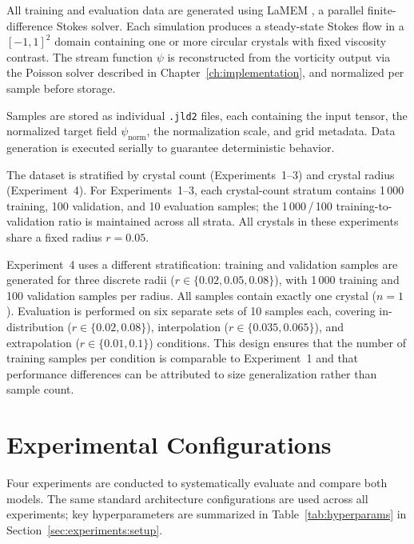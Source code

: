 All training and evaluation data are generated using LaMEM \parencite{Popov2013LaMEM}, a parallel finite-difference Stokes solver. Each simulation produces a steady-state Stokes flow in a $[-1,1]^2$ domain containing one or more circular crystals with fixed viscosity contrast. The stream function $\psi$ is reconstructed from the vorticity output via the Poisson solver described in Chapter~\ref{ch:implementation}, and normalized per sample before storage.

Samples are stored as individual \texttt{.jld2} files, each containing the input tensor, the normalized target field $\psi_{\mathrm{norm}}$, the normalization scale, and grid metadata. Data generation is executed serially to guarantee deterministic behavior.

The dataset is stratified by crystal count (Experiments~1--3) and crystal radius (Experiment~4). For Experiments~1--3, each crystal-count stratum contains 1\,000 training, 100 validation, and 10 evaluation samples; the 1\,000\,/\,100 training-to-validation ratio is maintained across all strata. All crystals in these experiments share a fixed radius $r = 0.05$.

Experiment~4 uses a different stratification: training and validation samples are generated for three discrete radii ($r \in \{0.02, 0.05, 0.08\}$), with 1\,000 training and 100 validation samples per radius. All samples contain exactly one crystal ($n = 1$). Evaluation is performed on six separate sets of 10 samples each, covering in-distribution ($r \in \{0.02, 0.08\}$), interpolation ($r \in \{0.035, 0.065\}$), and extrapolation ($r \in \{0.01, 0.1\}$) conditions. This design ensures that the number of training samples per condition is comparable to Experiment~1 and that performance differences can be attributed to size generalization rather than sample count.
\newpage
\section{Experimental Configurations}
\label{sec:experiments:configs}

Four experiments are conducted to systematically evaluate and compare both models.
The same standard architecture configurations are used across all experiments; key hyperparameters are summarized in Table~\ref{tab:hyperparams} in Section~\ref{sec:experiments:setup}.


